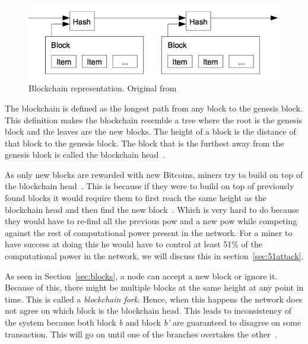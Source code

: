 \begin{figure}[h]
\centering
\includegraphics[scale=0.65]{figs/orderBlocks}
\caption{Blockchain representation. Original from~\protect\cite{nakamoto2008bitcoin}}
\label{fig:blocks}
\end{figure}

The blockchain is defined as the longest path from any block to the genesis block. This definition makes the blockchain resemble a tree where the root is the genesis block and the leaves are the new blocks. The height of a block is the distance of that block to the genesis block. The block that is the furthest away from the genesis block is called the blockchain head~\cite{decker2013information}. 

As only new blocks are rewarded with new Bitcoins, miners try to build on top of the blockchain head~\cite{decker2013information}. This is because if they were to build on top of previously found blocks it would require them to first reach the same height as the blockchain head and then find the new block~\cite{nakamoto2008bitcoin}. Which is very hard to do because they would have to re-find all the previous \acrshort{pow} and a new \acrshort{pow} while competing against the rest of computational power present in the network. For a miner to have success at doing this he would have to control at least 51\% of the computational power in the network, we will discuss this in section~\ref{sec:51attack}.

As seen in Section~\ref{sec:blocks}, a node can accept a new block or ignore it. Because of this, there might be multiple blocks at the same height at any point in time. This is called a \textit{blockchain fork}. Hence, when this happens the network does not agree on which block is the blockchain head. This leads to inconsistency of the system because both block \textit{b} and block \textit{b'} are guaranteed to disagree on some transaction. This will go on until one of the branches overtakes the other~\cite{decker2013information}.

